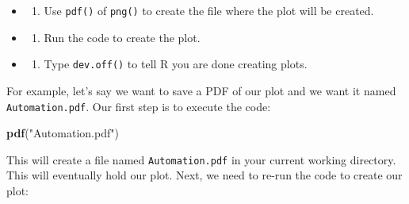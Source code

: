 \documentclass[
]{book}
\newenvironment{Shaded}{\begin{snugshade}}{\end{snugshade}}
\newcommand{\AttributeTok}[1]{\textcolor[rgb]{0.13,0.29,0.53}{#1}}
\newcommand{\DecValTok}[1]{\textcolor[rgb]{0.00,0.00,0.81}{#1}}
\newcommand{\FunctionTok}[1]{\textcolor[rgb]{0.13,0.29,0.53}{\textbf{#1}}}
\newcommand{\NormalTok}[1]{#1}
\newcommand{\SpecialCharTok}[1]{\textcolor[rgb]{0.81,0.36,0.00}{\textbf{#1}}}
\newcommand{\StringTok}[1]{\textcolor[rgb]{0.31,0.60,0.02}{#1}}
\providecommand{\tightlist}{%
  \setlength{\itemsep}{0pt}\setlength{\parskip}{0pt}}
\begin{document}
\begin{itemize}
\tightlist
\item
  \begin{enumerate}
  \def\labelenumi{\arabic{enumi}.}
  \tightlist
  \item
    Use \texttt{pdf()} of \texttt{png()} to create the file where the plot will be created.
  \end{enumerate}
\item
  \begin{enumerate}
  \def\labelenumi{\arabic{enumi}.}
  \setcounter{enumi}{1}
  \tightlist
  \item
    Run the code to create the plot.
  \end{enumerate}
\item
  \begin{enumerate}
  \def\labelenumi{\arabic{enumi}.}
  \setcounter{enumi}{2}
  \tightlist
  \item
    Type \texttt{dev.off()} to tell R you are done creating plots.
  \end{enumerate}
\end{itemize}

For example, let's say we want to save a PDF of our plot and we want it named \texttt{Automation.pdf}. Our first step is to execute the code:

\begin{Shaded}
\begin{Highlighting}[]
\FunctionTok{pdf}\NormalTok{(}\StringTok{"Automation.pdf"}\NormalTok{)}
\end{Highlighting}
\end{Shaded}

This will create a file named \texttt{Automation.pdf} in your current working directory. This will eventually hold our plot. Next, we need to re-run the code to create our plot:

\begin{Shaded}
\end{Shaded}
\end{document}
